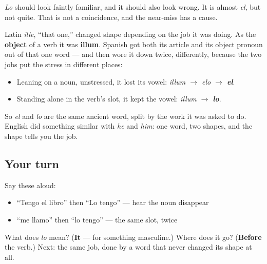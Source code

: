\begin{cousinweb}
\emph{Lo} should look faintly familiar, and it should also look wrong. It is almost \emph{el}, but not quite. That is not a coincidence, and the near-miss has a cause.

Latin \emph{ille}, \textquotedblleft{}that one,\textquotedblright{} changed shape depending on the job it was doing. As the \textbf{object} of a verb it was \textbf{illum}. Spanish got both its article and its object pronoun out of that one word — and then wore it down twice, differently, because the two jobs put the stress in different places:

\begin{itemize}
\raggedright
  \item Leaning on a noun, unstressed, it lost its vowel: \emph{illum $\to$ elo $\to$ \textbf{el}}.
  \item Standing alone in the verb's slot, it kept the vowel: \emph{illum $\to$ \textbf{lo}}.
\end{itemize}

So \emph{el} and \emph{lo} are the same ancient word, split by the work it was asked to do. English did something similar with \emph{he} and \emph{him}: one word, two shapes, and the shape tells you the job.
\end{cousinweb}

\subsection*{Your turn}
Say these aloud:

\begin{itemize}
\raggedright
  \item \textquotedblleft{}Tengo el libro\textquotedblright{} then \textquotedblleft{}Lo tengo\textquotedblright{} — hear the noun disappear
  \item \textquotedblleft{}me llamo\textquotedblright{} then \textquotedblleft{}lo tengo\textquotedblright{} — the same slot, twice
\end{itemize}

\begin{tcolorbox}[breakable,colback=teal!4,colframe=teal!35!black,title={Before you move on}]
What does \emph{lo} mean? (\textbf{It} — for something masculine.) Where does it go? (\textbf{Before} the verb.) Next: the same job, done by a word that never changed its shape at all.
\end{tcolorbox}
